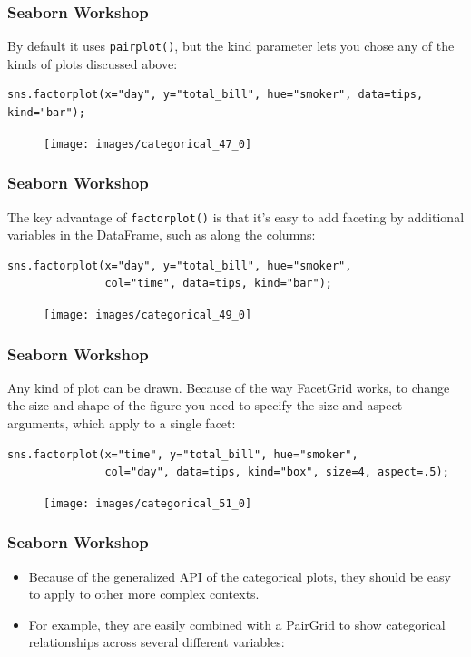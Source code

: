 \documentclass{beamer}
\begin{document}
\begin{frame}[fragile]
	\frametitle{Seaborn Workshop}
	\large
	
By default it uses \texttt{pairplot()}, but the kind parameter lets you chose any of the kinds of plots discussed above:

\begin{verbatim}
sns.factorplot(x="day", y="total_bill", hue="smoker", data=tips, kind="bar");
\end{verbatim}
\begin{figure}
	\centering
	\texttt{[image: images/categorical\_47\_0]}
	
\end{figure}
\end{frame}
\begin{frame}[fragile]
	\frametitle{Seaborn Workshop}
	\large
	
The key advantage of \texttt{factorplot()} is that it’s easy to add faceting by additional variables in the DataFrame, such as along the columns:
\begin{verbatim}
sns.factorplot(x="day", y="total_bill", hue="smoker",
               col="time", data=tips, kind="bar");
\end{verbatim}
\begin{figure}
	\centering
	\texttt{[image: images/categorical\_49\_0]}
	
\end{figure}
\end{frame}
\begin{frame}[fragile]
	\frametitle{Seaborn Workshop}
	\large
	
Any kind of plot can be drawn. Because of the way FacetGrid works, to change the size and shape of the figure you need to specify the size and aspect arguments, which apply to a single facet:
\begin{verbatim}
sns.factorplot(x="time", y="total_bill", hue="smoker",
               col="day", data=tips, kind="box", size=4, aspect=.5);

\end{verbatim}
\begin{figure}
	\centering
	\texttt{[image: images/categorical\_51\_0]}
	
\end{figure}\end{frame}
\begin{frame}[fragile]
	\frametitle{Seaborn Workshop}
	\large
	\begin{itemize}
\item 
Because of the generalized API of the categorical plots, they should be easy to apply to other more complex contexts. 
\item For example, they are easily combined with a PairGrid to show categorical relationships across several different variables:
	\end{itemize}
\end{frame}
\end{document}
